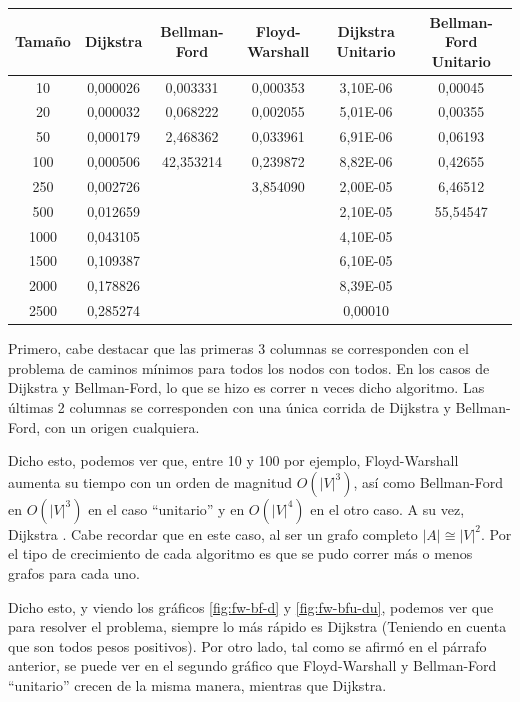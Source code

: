 \documentclass[a4paper,10pt]{article}
\begin{document}
	\begin{center}
		\begin{tabular}{ |c|c|c|c|c|c| }
			\hline
			\textbf{Tamaño} & \textbf{Dijkstra} & \textbf{Bellman-Ford} & \textbf{Floyd-Warshall} & \textbf{Dijkstra Unitario} & \textbf{Bellman-Ford Unitario} \\ 
			\hline
			10 & 0,000026 & 0,003331 & 0,000353 & 3,10E-06 & 0,00045 \\ \hline
			20 & 0,000032 & 0,068222 & 0,002055 & 5,01E-06 & 0,00355\\ \hline
			50 & 0,000179 & 2,468362 & 0,033961 & 6,91E-06 & 0,06193\\ \hline
			100 & 0,000506 & 42,353214 & 0,239872 & 8,82E-06 & 0,42655\\ \hline
			250 & 0,002726 &   & 3,854090 & 2,00E-05 & 6,46512\\ \hline
			500 & 0,012659 &   &   & 2,10E-05 & 55,54547\\ \hline
			1000 & 0,043105 &   &   & 4,10E-05 &  \\ \hline
			1500 & 0,109387 &   &   & 6,10E-05 &  \\ \hline
			2000 & 0,178826 &   &   & 8,39E-05 &  \\ \hline
			2500 & 0,285274 &   &   & 0,00010 &  \\
			\hline
		\end{tabular}
	\end{center}

	Primero, cabe destacar que las primeras 3 columnas se corresponden con el problema de caminos mínimos para todos los nodos con todos. En los casos de Dijkstra y Bellman-Ford, lo que se hizo es correr n veces dicho algoritmo. Las últimas 2 columnas se corresponden con una única corrida de Dijkstra y Bellman-Ford, con un origen cualquiera.

	Dicho esto, podemos ver que, entre 10 y 100 por ejemplo, Floyd-Warshall aumenta su tiempo con un orden de magnitud $O(|V|^3)$, así como Bellman-Ford en $O(|V|^3)$ en el caso ``unitario'' y en $O(|V|^4)$ en el otro caso. A su vez, Dijkstra . Cabe recordar que en este caso, al ser un grafo completo $|A| \cong |V|^2$. Por el tipo de crecimiento de cada algoritmo es que se pudo correr más o menos grafos para cada uno.

	Dicho esto, y viendo los gráficos \ref{fig:fw-bf-d} y \ref{fig:fw-bfu-du}, podemos ver que para resolver el problema, siempre lo más rápido es Dijkstra (Teniendo en cuenta que son todos pesos positivos). Por otro lado, tal como se afirmó en el párrafo anterior, se puede ver en el segundo gráfico que Floyd-Warshall y Bellman-Ford ``unitario'' crecen de la misma manera, mientras que Dijkstra.
\end{document}
